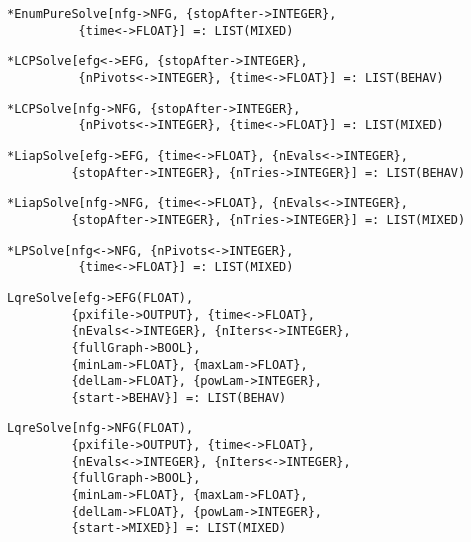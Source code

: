 \protect \large \begin{verbatim}
*EnumPureSolve[nfg->NFG, {stopAfter->INTEGER}, 
          {time<->FLOAT}] =: LIST(MIXED) 
\end{verbatim}\normalsize

\protect \large \begin{verbatim}
*LCPSolve[efg<->EFG, {stopAfter->INTEGER},
          {nPivots<->INTEGER}, {time<->FLOAT}] =: LIST(BEHAV)
\end{verbatim}\normalsize

\protect \large \begin{verbatim}
*LCPSolve[nfg->NFG, {stopAfter->INTEGER},
          {nPivots<->INTEGER}, {time<->FLOAT}] =: LIST(MIXED)
\end{verbatim}\normalsize

\protect \large \begin{verbatim}
*LiapSolve[efg->EFG, {time<->FLOAT}, {nEvals<->INTEGER},
         {stopAfter->INTEGER}, {nTries->INTEGER}] =: LIST(BEHAV)
\end{verbatim}\normalsize

\protect \large \begin{verbatim}
*LiapSolve[nfg->NFG, {time<->FLOAT}, {nEvals<->INTEGER},
         {stopAfter->INTEGER}, {nTries->INTEGER}] =: LIST(MIXED)
\end{verbatim}\normalsize

\protect \large \begin{verbatim}
*LPSolve[nfg<->NFG, {nPivots<->INTEGER},
          {time<->FLOAT}] =: LIST(MIXED)
\end{verbatim}\normalsize
 
\protect \large \begin{verbatim}
LqreSolve[efg->EFG(FLOAT),
         {pxifile->OUTPUT}, {time<->FLOAT},
         {nEvals<->INTEGER}, {nIters<->INTEGER},
         {fullGraph->BOOL},
         {minLam->FLOAT}, {maxLam->FLOAT}, 
         {delLam->FLOAT}, {powLam->INTEGER}, 
         {start->BEHAV}] =: LIST(BEHAV)
\end{verbatim}\normalsize

\protect \large \begin{verbatim}
LqreSolve[nfg->NFG(FLOAT),
         {pxifile->OUTPUT}, {time<->FLOAT},
         {nEvals<->INTEGER}, {nIters<->INTEGER},
         {fullGraph->BOOL},
         {minLam->FLOAT}, {maxLam->FLOAT}, 
         {delLam->FLOAT}, {powLam->INTEGER}, 
         {start->MIXED}] =: LIST(MIXED)
\end{verbatim}\normalsize

